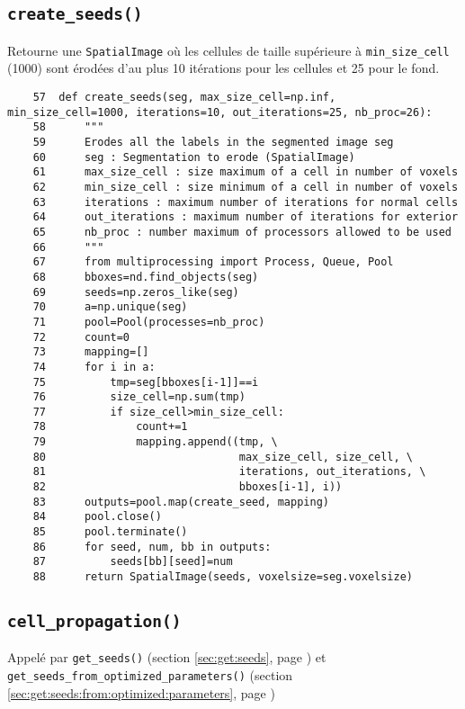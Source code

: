 \documentclass{article}
\def \mycolor {red}
\begin{document}
\subsection{\texttt{create\_seeds()}}
\label{sec:create:seeds}
\color{\mycolor}
Retourne une \texttt{SpatialImage} o\`u les cellules de taille sup\'erieure \`a \verb|min_size_cell| (1000) sont \'erod\'ees d'au plus 10 it\'erations pour les cellules et 25 pour le fond.
\color{black}
\begin{verbatim}
    57	def create_seeds(seg, max_size_cell=np.inf, min_size_cell=1000, iterations=10, out_iterations=25, nb_proc=26):
    58	    """
    59	    Erodes all the labels in the segmented image seg
    60	    seg : Segmentation to erode (SpatialImage)
    61	    max_size_cell : size maximum of a cell in number of voxels
    62	    min_size_cell : size minimum of a cell in number of voxels
    63	    iterations : maximum number of iterations for normal cells
    64	    out_iterations : maximum number of iterations for exterior
    65	    nb_proc : number maximum of processors allowed to be used
    66	    """
    67	    from multiprocessing import Process, Queue, Pool
    68	    bboxes=nd.find_objects(seg)
    69	    seeds=np.zeros_like(seg)
    70	    a=np.unique(seg)
    71	    pool=Pool(processes=nb_proc)
    72	    count=0
    73	    mapping=[]
    74	    for i in a:
    75	        tmp=seg[bboxes[i-1]]==i
    76	        size_cell=np.sum(tmp)
    77	        if size_cell>min_size_cell:
    78	            count+=1
    79	            mapping.append((tmp, \
    80	                            max_size_cell, size_cell, \
    81	                            iterations, out_iterations, \
    82	                            bboxes[i-1], i))
    83	    outputs=pool.map(create_seed, mapping)
    84	    pool.close()
    85	    pool.terminate()    
    86	    for seed, num, bb in outputs:
    87	        seeds[bb][seed]=num                         
    88	    return SpatialImage(seeds, voxelsize=seg.voxelsize)
\end{verbatim}





\subsection{\texttt{cell\_propagation()}}
\label{sec:cell:propagation}

\color{\mycolor}
Appel\'e par \texttt{get\_seeds()} (section \ref{sec:get:seeds}, page \pageref{sec:get:seeds}) et \texttt{get\_seeds\_from\_optimized\_parameters()} (section \ref{sec:get:seeds:from:optimized:parameters}, page \pageref{sec:get:seeds:from:optimized:parameters})
\end{document}
